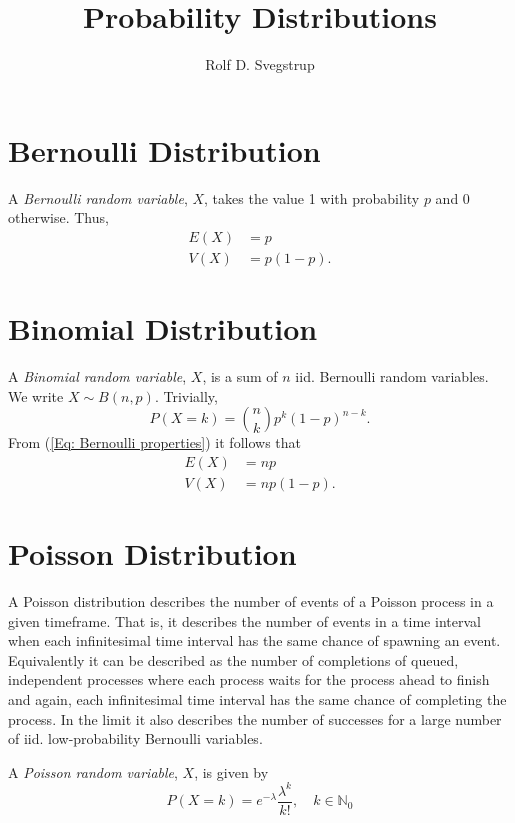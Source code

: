 \documentclass{article}
\title{Probability Distributions}
\author{Rolf D. Svegstrup}
\begin{document}
\maketitle

\section{Bernoulli Distribution}
A \emph{Bernoulli random variable}, $X$, takes the value 1 with probability $p$ and 0 otherwise. Thus,
\begin{equation}
\label{Eq: Bernoulli properties}
\begin{split}
E(X) &= p \\ 
V(X) &= p(1-p).
\end{split}
\end{equation}

\section{Binomial Distribution}
A \emph{Binomial random variable}, $X$, is a sum of $n$ iid. Bernoulli random variables. We write $X \sim B(n, p)$. Trivially,
\begin{equation}
P(X = k) = {n \choose k} p^k (1-p)^{n-k}.
\end{equation}
From (\ref{Eq: Bernoulli properties}) it follows that
\begin{equation}
\begin{split}
E(X) &= np \\
V(X) &= np(1-p) .
\end{split}
\end{equation}

\section{Poisson Distribution}
A Poisson distribution describes the number of events of a Poisson process in a given timeframe. That is, it describes the number of events in a time interval when each infinitesimal time interval has the same chance of spawning an event. Equivalently it can be described as the number of completions of queued, independent processes where each process waits for the process ahead to finish and again, each infinitesimal time interval has the same chance of completing the process. In the limit it also describes the number of successes for a large number of iid. low-probability Bernoulli variables.

A \emph{Poisson random variable}, $X$, is given by 
\begin{equation}
P(X = k) = e^{-\lambda} \frac{\lambda^k}{k!}, \quad k \in \mathbb{N}_0
\end{equation}
\end{document}
